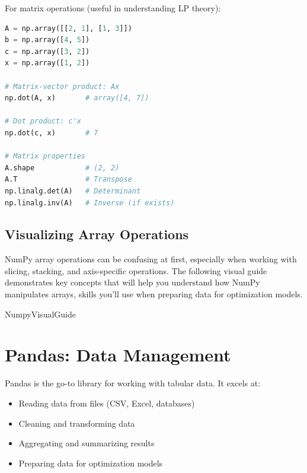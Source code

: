 For matrix operations (useful in understanding LP theory):

\begin{lstlisting}[language=Python]
A = np.array([[2, 1], [1, 3]])
b = np.array([4, 5])
c = np.array([3, 2])
x = np.array([1, 2])

# Matrix-vector product: Ax
np.dot(A, x)       # array([4, 7])

# Dot product: c'x
np.dot(c, x)       # 7

# Matrix properties
A.shape            # (2, 2)
A.T                # Transpose
np.linalg.det(A)   # Determinant
np.linalg.inv(A)   # Inverse (if exists)
\end{lstlisting}


\subsection{Visualizing Array Operations}

NumPy array operations can be confusing at first, especially when working with slicing, stacking, and axis-specific operations. The following visual guide demonstrates key concepts that will help you understand how NumPy manipulates arrays, skills you'll use when preparing data for optimization models.

{NumpyVisualGuide}

\section{Pandas: Data Management}

Pandas is the go-to library for working with tabular data. It excels at:
\begin{itemize}
\item Reading data from files (CSV, Excel, databases)
\item Cleaning and transforming data
\item Aggregating and summarizing results
\item Preparing data for optimization models
\end{itemize}

